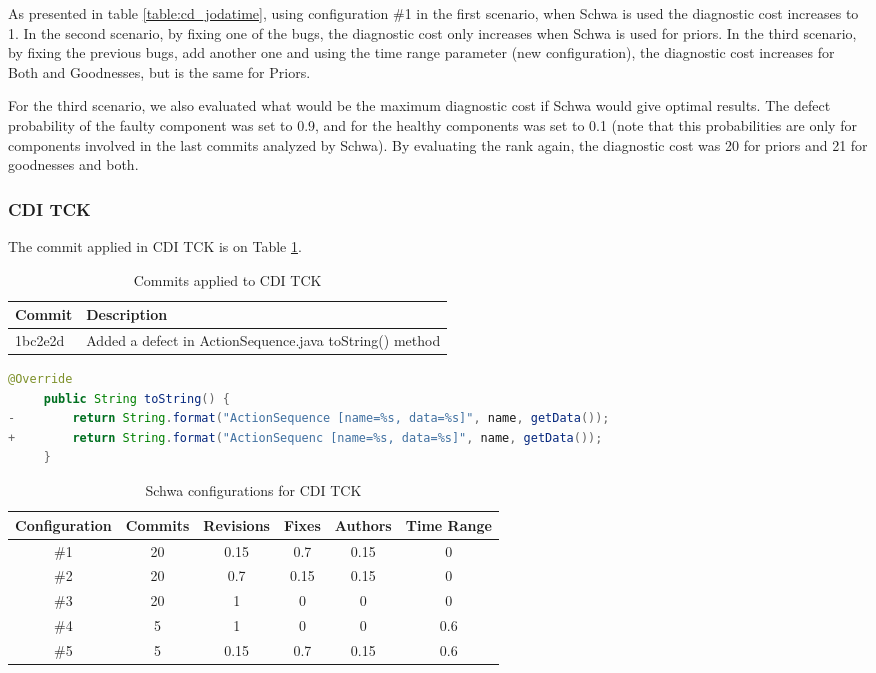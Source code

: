 As presented in table \ref{table:cd_jodatime}, using configuration \#1 in the
first scenario, when Schwa is used the diagnostic cost increases to 1. In the
second scenario, by fixing one of the bugs, the diagnostic cost only increases
when Schwa is used for priors. In the third scenario, by fixing the previous
bugs, add another one and using the time range parameter (new configuration),
the diagnostic cost increases for Both and Goodnesses, but is the same for Priors.

For the third scenario, we also evaluated what would be the maximum diagnostic
cost if Schwa would give optimal results. The defect probability of the faulty
component was set to 0.9, and for the healthy components was set to 0.1 (note
that this probabilities are only for components involved in the last commits
analyzed by Schwa). By evaluating the rank again, the diagnostic cost was 20
for priors and 21 for goodnesses and both.

\subsubsection{CDI TCK}
The commit applied in CDI TCK is on Table \ref{table:commits_cditck}.
\begin{table}[H]
    \centering
    \caption{Commits applied to CDI TCK}
    \label{table:commits_cditck}
    \begin{tabular}{|l|l|}
        \hline
        Commit & Description \\ \hline
        1bc2e2d	& Added a defect in ActionSequence.java toString() method \\ \hline

    \end{tabular}
\end{table}

\begin{lstlisting}[language=java, caption=Commit 1bc2e2d patch]
   @Override
     public String toString() {
-        return String.format("ActionSequence [name=%s, data=%s]", name, getData());
+        return String.format("ActionSequenc [name=%s, data=%s]", name, getData());
     }
\end{lstlisting}

\begin{table}[H]
    \centering
    \caption{Schwa configurations for CDI TCK}
    \label{table:configs_cdi_tck}
    \begin{tabular}{|c|c|c|c|c|c|}
        \hline
        Configuration & Commits & Revisions & Fixes & Authors & Time Range \\ \hline
        \#1 & 20 & 0.15 & 0.7 & 0.15 & 0\\ \hline
        \#2 & 20 & 0.7 & 0.15 & 0.15 & 0\\ \hline
        \#3 & 20 & 1 & 0 & 0 & 0\\ \hline
        \#4 & 5 & 1 & 0 & 0 & 0.6\\ \hline
        \#5 & 5 & 0.15 & 0.7 & 0.15 & 0.6\\ \hline
    \end{tabular}
\end{table}

